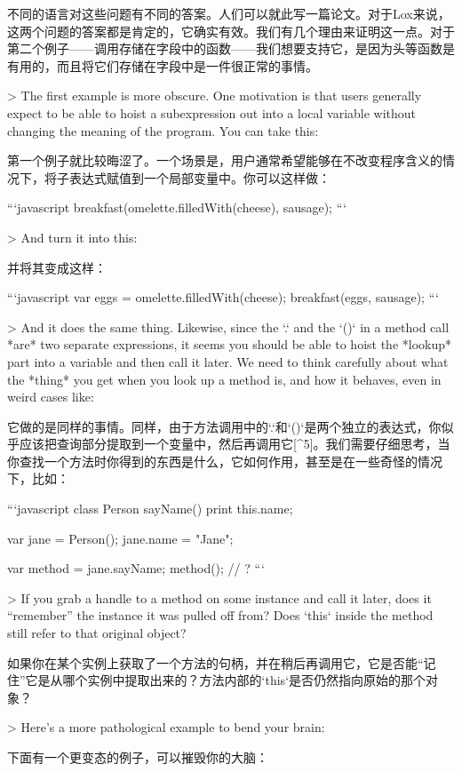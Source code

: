 \documentclass[cn,11pt,chinese]{elegantbook}
\begin{document}
{{{{{{{{{{{{{{{{{{{{不同的语言对这些问题有不同的答案。人们可以就此写一篇论文。对于Lox来说，这两个问题的答案都是肯定的，它确实有效。我们有几个理由来证明这一点。对于第二个例子——调用存储在字段中的函数——我们想要支持它，是因为头等函数是有用的，而且将它们存储在字段中是一件很正常的事情。

> The first example is more obscure. One motivation is that users generally expect to be able to hoist a subexpression out into a local variable without changing the meaning of the program. You can take this:

第一个例子就比较晦涩了。一个场景是，用户通常希望能够在不改变程序含义的情况下，将子表达式赋值到一个局部变量中。你可以这样做：

```javascript
breakfast(omelette.filledWith(cheese), sausage);
```

> And turn it into this:

并将其变成这样：

```javascript
var eggs = omelette.filledWith(cheese);
breakfast(eggs, sausage);
```

> And it does the same thing. Likewise, since the `.` and the `()` in a method call *are* two separate expressions, it seems you should be able to hoist the *lookup* part into a variable and then call it later. We need to think carefully about what the *thing* you get when you look up a method is, and how it behaves, even in weird cases like:

它做的是同样的事情。同样，由于方法调用中的`.`和`()`是两个独立的表达式，你似乎应该把查询部分提取到一个变量中，然后再调用它[^5]。我们需要仔细思考，当你查找一个方法时你得到的东西是什么，它如何作用，甚至是在一些奇怪的情况下，比如：

```javascript
class Person {
  sayName() {
    print this.name;
  }
}

var jane = Person();
jane.name = "Jane";

var method = jane.sayName;
method(); // ?
```

> If you grab a handle to a method on some instance and call it later, does it “remember” the instance it was pulled off from? Does `this` inside the method still refer to that original object?

如果你在某个实例上获取了一个方法的句柄，并在稍后再调用它，它是否能“记住”它是从哪个实例中提取出来的？方法内部的`this`是否仍然指向原始的那个对象？

> Here’s a more pathological example to bend your brain:

下面有一个更变态的例子，可以摧毁你的大脑：

}}}}}}}}}}}}}}}}}}}}
\end{document}
